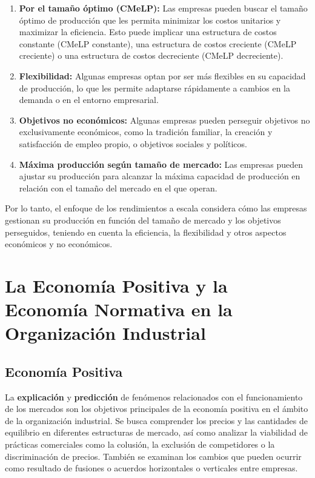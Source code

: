 \documentclass[
  letterpaper,
  DIV=11,
  numbers=noendperiod]{scrartcl}
\begin{document}
\begin{enumerate}
\def\labelenumi{\Alph{enumi})}
\item
  \textbf{Por el tamaño óptimo (CMeLP):} Las empresas pueden buscar el
  tamaño óptimo de producción que les permita minimizar los costos
  unitarios y maximizar la eficiencia. Esto puede implicar una
  estructura de costos constante (CMeLP constante), una estructura de
  costos creciente (CMeLP creciente) o una estructura de costos
  decreciente (CMeLP decreciente).
\item
  \textbf{Flexibilidad:} Algunas empresas optan por ser más flexibles en
  su capacidad de producción, lo que les permite adaptarse rápidamente a
  cambios en la demanda o en el entorno empresarial.
\item
  \textbf{Objetivos no económicos:} Algunas empresas pueden perseguir
  objetivos no exclusivamente económicos, como la tradición familiar, la
  creación y satisfacción de empleo propio, o objetivos sociales y
  políticos.
\item
  \textbf{Máxima producción según tamaño de mercado:} Las empresas
  pueden ajustar su producción para alcanzar la máxima capacidad de
  producción en relación con el tamaño del mercado en el que operan.
\end{enumerate}

Por lo tanto, el enfoque de los rendimientos a escala considera cómo las
empresas gestionan su producción en función del tamaño de mercado y los
objetivos perseguidos, teniendo en cuenta la eficiencia, la flexibilidad
y otros aspectos económicos y no económicos.

\hypertarget{la-economuxeda-positiva-y-la-economuxeda-normativa-en-la-organizaciuxf3n-industrial}{%
\section{La Economía Positiva y la Economía Normativa en la Organización
Industrial}\label{la-economuxeda-positiva-y-la-economuxeda-normativa-en-la-organizaciuxf3n-industrial}}

\hypertarget{economuxeda-positiva}{%
\subsection{Economía Positiva}\label{economuxeda-positiva}}

La \textbf{explicación} y \textbf{predicción} de fenómenos relacionados
con el funcionamiento de los mercados son los objetivos principales de
la economía positiva en el ámbito de la organización industrial. Se
busca comprender los precios y las cantidades de equilibrio en
diferentes estructuras de mercado, así como analizar la viabilidad de
prácticas comerciales como la colusión, la exclusión de competidores o
la discriminación de precios. También se examinan los cambios que pueden
ocurrir como resultado de fusiones o acuerdos horizontales o verticales
entre empresas.
\end{document}
